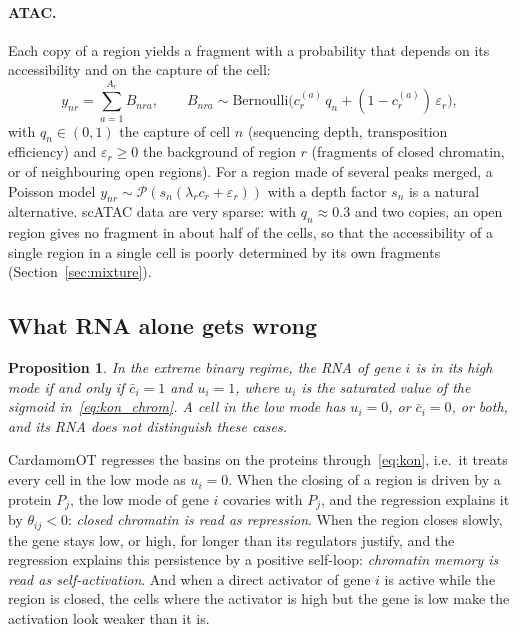 \documentclass[a4paper, 11pt]{article}
\newcommand{\cbar}{\bar c}
\theoremstyle{plain}
\newtheorem{prop}{Proposition}
\theoremstyle{remark}
\begin{document}
\paragraph{ATAC.} Each copy of a region yields a fragment with a probability that depends on its accessibility and on the capture of the cell:
\begin{equation}\label{eq:atac}
y_{nr} = \sum_{a=1}^{A_r} B_{nra}, \qquad B_{nra} \sim \mathrm{Bernoulli}\bigl(c_r^{(a)}\,q_n + (1 - c_r^{(a)})\,\varepsilon_r\bigr),
\end{equation}
with $q_n \in (0,1)$ the capture of cell $n$ (sequencing depth, transposition efficiency) and $\varepsilon_r \geq 0$ the background of region $r$ (fragments of closed chromatin, or of neighbouring open regions). For a region made of several peaks merged, a Poisson model $y_{nr} \sim \mathcal{P}(s_n(\lambda_r c_r + \varepsilon_r))$ with a depth factor $s_n$ is a natural alternative. scATAC data are very sparse: with $q_n \approx 0.3$ and two copies, an open region gives no fragment in about half of the cells, so that the accessibility of a single region in a single cell is poorly determined by its own fragments (Section~\ref{sec:mixture}).

\subsection{What RNA alone gets wrong}\label{sec:confounding}

\begin{prop}\label{prop:confounding}
In the extreme binary regime, the RNA of gene $i$ is in its high mode if and only if $\cbar_i = 1$ and $u_i = 1$, where $u_i$ is the saturated value of the sigmoid in~\eqref{eq:kon_chrom}. A cell in the low mode has $u_i = 0$, or $\cbar_i = 0$, or both, and its RNA does not distinguish these cases.
\end{prop}

CardamomOT regresses the basins on the proteins through~\eqref{eq:kon}, i.e.\ it treats every cell in the low mode as $u_i = 0$. When the closing of a region is driven by a protein $P_j$, the low mode of gene $i$ covaries with $P_j$, and the regression explains it by $\theta_{ij} < 0$: \emph{closed chromatin is read as repression}. When the region closes slowly, the gene stays low, or high, for longer than its regulators justify, and the regression explains this persistence by a positive self-loop: \emph{chromatin memory is read as self-activation}. And when a direct activator of gene $i$ is active while the region is closed, the cells where the activator is high but the gene is low make the activation look weaker than it is.
\end{document}
